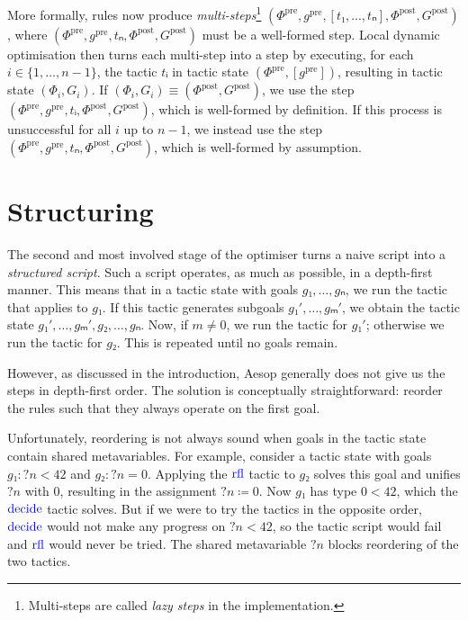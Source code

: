 \documentclass[sigplan,10pt,anonymous,review]{acmart}
\newcommand{\tac}[1]{\ensuremath{\mathrm{\mathcolor{blue}{#1}}}}
\newcommand{\mvar}[1]{{?#1}}
\newcommand{\pre}{\mathrm{pre}}
\newcommand{\post}{\mathrm{post}}
\newcommand{\step}[5]{\ensuremath{(#1,\allowbreak #2,\allowbreak #3,\allowbreak #4,\allowbreak #5)}}
\begin{document}
More formally, rules now produce \emph{multi-steps}\footnote{Multi-steps are called \emph{lazy steps} in the implementation.} $\step{Φ^{\pre}}{g^{\pre}}{[t₁, ..., tₙ]}{Φ^{\post}}{G^{\post}}$, where $\step{Φ^{\pre}}{g^{\pre}}{tₙ}{Φ^{\post}}{G^{\post}}$ must be a well-formed step.
Local dynamic optimisation then turns each multi-step into a step by executing, for each $i ∈ \{1, \dots, n-1\}$, the tactic $tᵢ$ in tactic state $(Φ^{\pre}, [g^{\pre}])$, resulting in tactic state $(Φ_{i}, G_{i})$.
If $(Φ_{i}, G_{i}) ≡ (Φ^{\post}, G^{\post})$, we use the step $(Φ^{\pre}, g^{\pre}, tᵢ, Φ^{\post}, G^{\post})$, which is well-formed by definition.
If this process is unsuccessful for all $i$ up to $n-1$, we instead use the step $(Φ^{\pre}, g^{\pre}, tₙ, Φ^{\post}, G^{\post})$, which is well-formed by assumption.

\section{Structuring}%
\label{sec:structuring}

The second and most involved stage of the optimiser turns a naive script into a \emph{structured script}.
Such a script operates, as much as possible, in a depth-first manner.
This means that in a tactic state with goals $g₁, \dots, gₙ$, we run the tactic that applies to $g₁$.
If this tactic generates subgoals $g₁', \dots, gₘ'$, we obtain the tactic state $g₁', \dots, gₘ', g₂, \dots, gₙ$.
Now, if $m ≠ 0$, we run the tactic for $g₁'$; otherwise we run the tactic for $g₂$.
This is repeated until no goals remain.

However, as discussed in the introduction, Aesop generally does not give us the steps in depth-first order.
The solution is conceptually straightforward: reorder the rules such that they always operate on the first goal.

Unfortunately, reordering is not always sound when goals in the tactic state contain shared metavariables.
For example, consider a tactic state with goals $g₁ : \mvar{n} < 42$ and $g₂ : \mvar{n} = 0$.
Applying the \tac{rfl} tactic to $g₂$ solves this goal and unifies $\mvar{n}$ with $0$, resulting in the assignment $\mvar{n} ≔ 0$.
Now $g₁$ has type $0 < 42$, which the \tac{decide} tactic solves.
But if we were to try the tactics in the opposite order, \tac{decide} would not make any progress on $\mvar{n} < 42$, so the tactic script would fail and \tac{rfl} would never be tried.
The shared metavariable $\mvar{n}$ blocks reordering of the two tactics.
\end{document}
